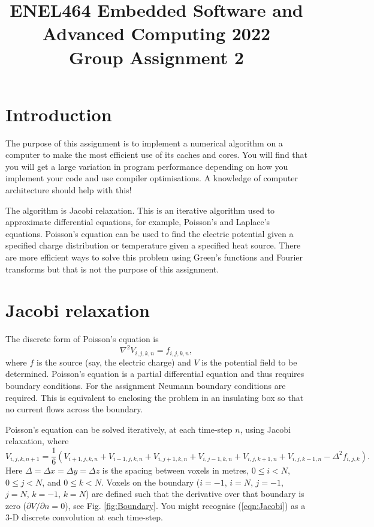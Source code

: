 \documentclass[a4paper,11pt]{article}
\begin{document}
\title{ \bf ENEL464 Embedded Software and Advanced Computing 2022 \\ Group Assignment 2}
\author{}
\date{}
\maketitle


\section{Introduction}

The purpose of this assignment is to implement a numerical algorithm
on a computer to make the most efficient use of its caches and cores.
You will find that you will get a large variation in program
performance depending on how you implement your code and use compiler
optimisations.  A knowledge of computer architecture should help with
this!

The algorithm is Jacobi relaxation.  This is an iterative algorithm
used to approximate differential equations, for example, Poisson's and
Laplace's equations.  Poisson's equation can be used to find the
electric potential given a specified charge distribution or
temperature given a specified heat source.  There are more efficient
ways to solve this problem using Green's functions and Fourier
transforms but that is not the purpose of this assignment.

\section{Jacobi relaxation}

The discrete form of Poisson's equation is
%
\begin{equation}
  \nabla^2 V_{i,j,k,n} = f_{i,j,k,n},
\end{equation}
%
where $f$ is the source (say, the electric charge) and $V$ is the
potential field to be determined.  Poisson's equation is a partial
differential equation and thus requires boundary conditions.  For the
assignment Neumann boundary conditions are required.  This is
equivalent to enclosing the problem in an insulating box so that no
current flows across the boundary.

Poisson's equation can be solved iteratively, at each time-step $n$,
using Jacobi relaxation, where
%
\begin{equation}
  V_{i,j,k,n+1} = \frac{1}{6} \left(V_{i+1,j,k,n} + V_{i-1,j,k,n} + V_{i,j+1,k,n} + V_{i,j-1,k,n} + V_{i,j,k+1,n} + V_{i,j,k-1,n} - \Delta^2 f_{i,j,k}\right).
\label{eqn:Jacobi}
\end{equation}
%
Here $\Delta = \Delta x = \Delta y = \Delta z$ is the spacing between
voxels in metres, $0 \le i < N$, $0 \le j < N$, and $0 \le k <
N$. Voxels on the boundary ($i = -1$, $i=N$, $j = -1$, $j=N$, $k =
-1$, $k=N$) are defined such that the derivative over that boundary is
zero ($\partial V / \partial n = 0$), see Fig.  \ref{fig:Boundary}.
You might recognise (\ref{eqn:Jacobi}) as a 3-D discrete convolution
at each time-step.
\end{document}
